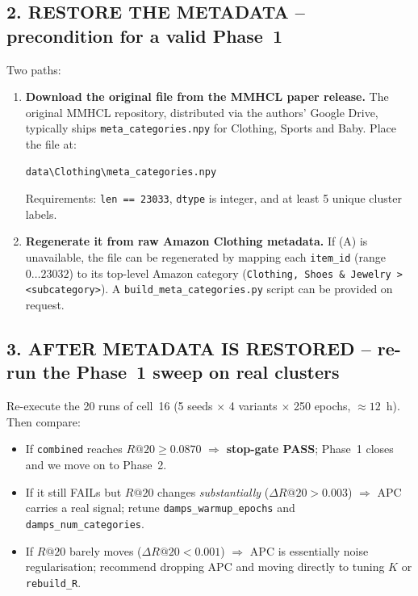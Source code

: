 \documentclass[11pt,a4paper]{article}
\begin{document}
\subsection*{2. RESTORE THE METADATA -- precondition for a valid Phase~1}

Two paths:

\begin{enumerate}[label=(\Alph*),leftmargin=*]
  \item \textbf{Download the original file from the MMHCL paper release.} The
        original MMHCL repository, distributed via the authors' Google Drive,
        typically ships \texttt{meta\_categories.npy} for Clothing, Sports
        and Baby. Place the file at:
        \begin{lstlisting}
data\Clothing\meta_categories.npy
        \end{lstlisting}
        Requirements: \texttt{len == 23033},
        \texttt{dtype} is integer, and at least 5 unique cluster labels.

  \item \textbf{Regenerate it from raw Amazon Clothing metadata.} If (A) is
        unavailable, the file can be regenerated by mapping each
        \texttt{item\_id} (range \(0\ldots 23032\)) to its top-level Amazon
        category
        (\texttt{Clothing, Shoes \& Jewelry > <subcategory>}).
        A \texttt{build\_meta\_categories.py} script can be provided on
        request.
\end{enumerate}

\subsection*{3. AFTER METADATA IS RESTORED -- re-run the Phase~1 sweep on
real clusters}

Re-execute the 20 runs of cell~16 (5 seeds $\times$ 4 variants $\times$ 250
epochs, $\approx 12$~h). Then compare:

\begin{itemize}[leftmargin=*]
  \item If \texttt{combined} reaches $R@20 \geq 0.0870$
        $\Rightarrow$ \textbf{stop-gate PASS}; Phase~1 closes and we move
        on to Phase~2.
  \item If it still FAILs but $R@20$ changes \emph{substantially}
        ($\Delta R@20 > 0.003$) $\Rightarrow$ APC carries a real signal;
        retune \texttt{damps\_warmup\_epochs} and
        \texttt{damps\_num\_categories}.
  \item If $R@20$ barely moves ($\Delta R@20 < 0.001$) $\Rightarrow$ APC
        is essentially noise regularisation; recommend dropping APC and
        moving directly to tuning $K$ or \texttt{rebuild\_R}.
\end{itemize}
\end{document}
